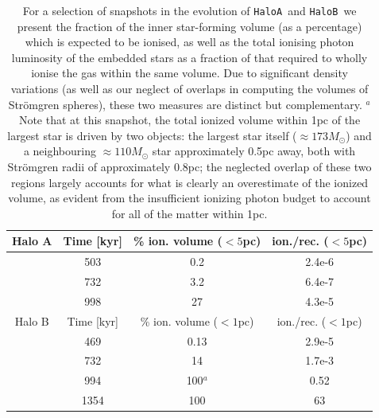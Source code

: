 \documentclass[graphics, twocolumn, usenatbib]{mn2e}
\newcommand{\ha} {\texttt{HaloA~}}
\newcommand{\hb} {\texttt{HaloB~}}
\begin{document}

\begin{table}
    \centering
    \begin{tabular}{c|ccc}
         Halo A &  Time [kyr] & \% ion. volume ($<5$pc) & ion./rec. ($<5$pc)\\
         \hline
          & 503 & 0.2 & 2.4e-6\\
          & 732 & 3.2 & 6.4e-7\\
          & 998 & 27 & 4.3e-5\\
          Halo B &  Time [kyr] & \% ion. volume ($<1$pc) & ion./rec. ($<1$pc)\\
          \hline
          & 469 & 0.13 & 2.9e-5\\
          & 732 & 14 & 1.7e-3\\
          & 994 & 100$^{a}$ & 0.52\\
          & 1354 & 100 & 63\\
    \end{tabular}
    \caption{For a selection of snapshots in the evolution of \ha and \hb we present the fraction of the inner star-forming volume (as a percentage) which is expected to be ionised, as well as the total ionising photon luminosity of the embedded stars as a fraction of that required to wholly ionise the gas within the same volume. Due to significant density variations (as well as our neglect of overlaps in computing the volumes of Str{\"o}mgren spheres), these two measures are distinct but complementary. $^{a}$Note that at this snapshot, the total ionized volume within 1pc of the largest star is driven by two objects: the largest star itself ($\approx 173M_{\odot}$) and a neighbouring $\approx 110 M_{\odot}$ star approximately 0.5pc away, both with Str{\" o}mgren radii of approximately 0.8pc; the neglected overlap of these two regions largely accounts for what is clearly an overestimate of the ionized volume, as evident from the insufficient ionizing photon budget to account for all of the matter within 1pc.}
    \label{tab:feedback}
\end{table}
\end{document}
